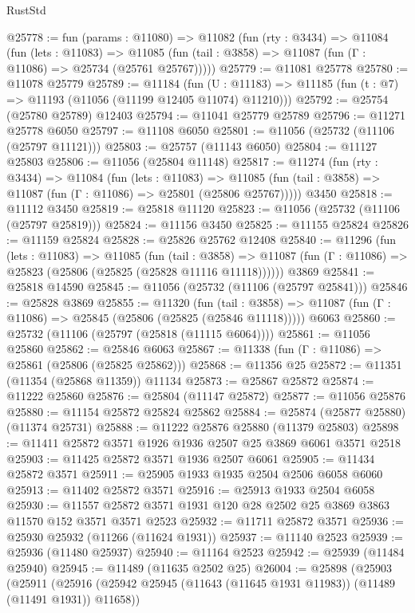 \begin{lexlean}{RustStd}
\begin{coremodule}
@25778 := fun (params : @11080) =>
  @11082
    (fun (rty : @3434) =>
    @11084
      (fun (lets : @11083) =>
      @11085 (fun (tail : @3858) => @11087 (fun (Γ : @11086) => @25734 (@25761 @25767)))))
@25779 := @11081 @25778
@25780 := @11078 @25779
@25789 := @11184
    (fun (U : @11183) => @11185 (fun (t : @7) => @11193 (@11056 (@11199 @12405 @11074) @11210)))
@25792 := @25754 (@25780 @25789) @12403
@25794 := @11041 @25779 @25789
@25796 := @11271 @25778 @6050
@25797 := @11108 @6050
@25801 := @11056 (@25732 (@11106 (@25797 @11121)))
@25803 := @25757 (@11143 @6050)
@25804 := @11127 @25803
@25806 := @11056 (@25804 @11148)
@25817 := @11274
    (fun (rty : @3434) =>
    @11084
      (fun (lets : @11083) =>
      @11085 (fun (tail : @3858) => @11087 (fun (Γ : @11086) => @25801 (@25806 @25767)))))
    @3450
@25818 := @11112 @3450
@25819 := @25818 @11120
@25823 := @11056 (@25732 (@11106 (@25797 @25819)))
@25824 := @11156 @3450
@25825 := @11155 @25824
@25826 := @11159 @25824
@25828 := @25826 @25762 @12408
@25840 := @11296
    (fun (lets : @11083) =>
    @11085
      (fun (tail : @3858) =>
      @11087 (fun (Γ : @11086) => @25823 (@25806 (@25825 (@25828 @11116 @11118))))))
    @3869
@25841 := @25818 @14590
@25845 := @11056 (@25732 (@11106 (@25797 @25841)))
@25846 := @25828 @3869
@25855 := @11320
    (fun (tail : @3858) => @11087 (fun (Γ : @11086) => @25845 (@25806 (@25825 (@25846 @11118)))))
    @6063
@25860 := @25732 (@11106 (@25797 (@25818 (@11115 @6064))))
@25861 := @11056 @25860
@25862 := @25846 @6063
@25867 := @11338 (fun (Γ : @11086) => @25861 (@25806 (@25825 @25862)))
@25868 := @11356 @25
@25872 := @11351 (@11354 (@25868 @11359)) @11134
@25873 := @25867 @25872
@25874 := @11222 @25860
@25876 := @25804 (@11147 @25872)
@25877 := @11056 @25876
@25880 := @11154 @25872 @25824 @25862
@25884 := @25874 (@25877 @25880) (@11374 @25731)
@25888 := @11222 @25876 @25880 (@11379 @25803)
@25898 := @11411 @25872 @3571 @1926 @1936 @2507 @25 @3869 @6061 @3571 @2518
@25903 := @11425 @25872 @3571 @1936 @2507 @6061
@25905 := @11434 @25872 @3571
@25911 := @25905 @1933 @1935 @2504 @2506 @6058 @6060
@25913 := @11402 @25872 @3571
@25916 := @25913 @1933 @2504 @6058
@25930 := @11557 @25872 @3571 @1931 @120 @28 @2502 @25 @3869 @3863 @11570 @152 @3571 @3571 @2523
@25932 := @11711 @25872 @3571
@25936 := @25930 @25932 (@11266 (@11624 @1931))
@25937 := @11140 @2523
@25939 := @25936 (@11480 @25937)
@25940 := @11164 @2523
@25942 := @25939 (@11484 @25940)
@25945 := @11489 (@11635 @2502 @25)
@26004 := @25898
    (@25903
      (@25911
        (@25916 (@25942 @25945 (@11643 (@11645 @1931 @11983)) (@11489 (@11491 @1931)) @11658))

\end{coremodule}
\end{lexlean}
